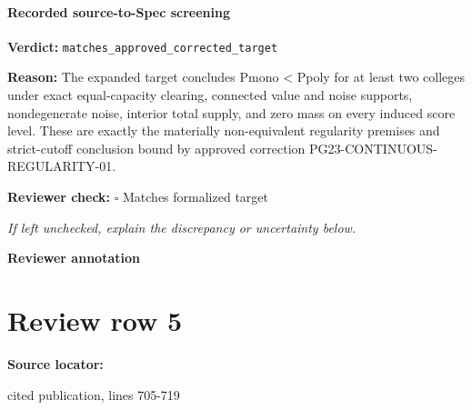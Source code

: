 \documentclass[10pt]{article}
\newcommand{\reviewerbox}{%
  \par\noindent\fbox{\parbox{0.96\linewidth}{\rule{0pt}{0.38in}}}\par
}
\newcommand{\reviewmatch}[1]{%
  \par\noindent\textbf{Reviewer check:} $\square$\; #1\par
  \noindent\emph{If left unchecked, explain the discrepancy or uncertainty below.}\par
}
\begin{document}
\paragraph{Recorded source-to-Spec screening}
\textbf{Verdict:} \texttt{matches\_approved\_corrected\_target}
\\
{\raggedright
\textbf{Reason:} The expanded target concludes Pmono < Ppoly for at least two colleges under exact equal-\allowbreak{}capacity clearing, connected value and noise supports, nondegenerate noise, interior total supply, and zero mass on every induced score level.\allowbreak{} These are exactly the materially non-\allowbreak{}equivalent regularity premises and strict-\allowbreak{}cutoff conclusion bound by approved correction PG23-\allowbreak{}CONTINUOUS-\allowbreak{}REGULARITY-\allowbreak{}01.\allowbreak{}
\par}
\reviewmatch{Matches formalized target}
\noindent\textbf{Reviewer annotation}\par
\reviewerbox
\clearpage
\hypertarget{source-claim-1c90e53a61fa6474}{}
\section*{Review row 5}
\textbf{Source locator:} {\footnotesize\raggedright cited publication, lines 705-\allowbreak{}719\par}
\end{document}
